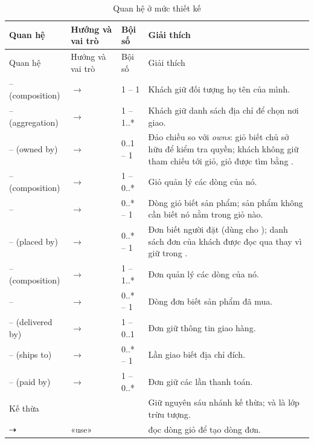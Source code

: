 \documentclass[12pt,a4paper]{article}
\begin{document}
\begin{longtable}{@{}P{3.5cm}P{3.3cm}P{1.9cm}P{6.8cm}@{}}
\caption{Quan hệ ở mức thiết kế}\label{tab:nav}\\
\toprule
Quan hệ & Hướng và vai trò & Bội số & Giải thích\\
\midrule
\endfirsthead
\toprule
Quan hệ & Hướng và vai trò & Bội số & Giải thích\\
\midrule
\endhead
\small{} --  (composition) & \small{} $\to$  & \small 1 -- 1 & \small Khách giữ đối tượng họ tên của mình.\\
\small{} --  (aggregation) & \small{} $\to$  & \small 1 -- 1..* & \small Khách giữ danh sách địa chỉ để chọn nơi giao.\\
\small{} --  (owned by) & \small{} $\to$  & \small 0..1 -- 1 & \small Đảo chiều so với \emph{owns}: giỏ biết chủ sở hữu để kiểm tra quyền; khách không giữ tham chiếu tới giỏ, giỏ được tìm bằng .\\
\small{} --  (composition) & \small{} $\to$  & \small 1 -- 0..* & \small Giỏ quản lý các dòng của nó.\\
\small{} --  & \small{} $\to$  & \small 0..* -- 1 & \small Dòng giỏ biết sản phẩm; sản phẩm không cần biết nó nằm trong giỏ nào.\\
\small{} --  (placed by) & \small{} $\to$  & \small 0..* -- 1 & \small Đơn biết người đặt (dùng cho ); danh sách đơn của khách được đọc qua  thay vì giữ trong .\\
\small{} --  (composition) & \small{} $\to$  & \small 1 -- 1..* & \small Đơn quản lý các dòng của nó.\\
\small{} --  & \small{} $\to$  & \small 0..* -- 1 & \small Dòng đơn biết sản phẩm đã mua.\\
\small{} --  (delivered by) & \small{} $\to$  & \small 1 -- 0..1 & \small Đơn giữ thông tin giao hàng.\\
\small{} --  (ships to) & \small{} $\to$  & \small 0..* -- 1 & \small Lần giao biết địa chỉ đích.\\
\small{} --  (paid by) & \small{} $\to$  & \small 1 -- 0..* & \small Đơn giữ các lần thanh toán.\\
\small Kế thừa & \small {} & & \small Giữ nguyên sáu nhánh kế thừa;  và  là lớp trừu tượng.\\
\small{} $\dashrightarrow$  & \small «use» & & \small {} đọc dòng giỏ để tạo dòng đơn.\\
\bottomrule
\end{longtable}
\end{document}
